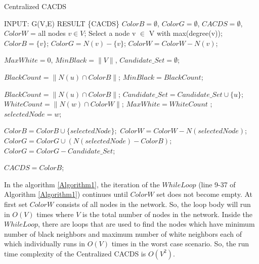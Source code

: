 \begin{algorithm}

\caption{Centralized CACDS}
\label{Algorithm1}

\begin{algorithmic}[1]
 \STATE INPUT: G(V,E)
 \STATE RESULT \{CACDS\}
\STATE $ColorB=\emptyset$, $ColorG=\emptyset$, $CACDS=\emptyset$,
\STATE $ColorW$ = all nodes $v\in V$;
\STATE Select a node v $\in$ V with max(degree(v));
\STATE $ ColorB = \{v\} $;
\STATE $ ColorG= N(v)-\{v\}$;
\STATE $ ColorW=ColorW-N(v)$;


 
   \STATE $MaxWhite=0$, $MinBlack=\|V\|$, $Candidate\_Set=\emptyset$;
 
        
            \STATE $BlackCount = \|N(u) \cap ColorB\|$;
                \STATE $MinBlack= BlackCount$;
            \ENDIF
        \ENDFOR
        
            \STATE $ BlackCount = \|N(u) \cap ColorB\|$;
           \STATE $ Candidate\_Set = Candidate\_Set \cup \{u\} $;
            \ENDIF
        \ENDFOR
                \STATE $ WhiteCount = \|N(w) \cap ColorW\|$;
                 \STATE  $MaxWhite= WhiteCount$ ;
                 \STATE $selectedNode=w$;
                \ENDIF
            \ENDFOR
            
               
                \STATE $ ColorB = ColorB \cup \{selectedNode\}; $ 
                \STATE $ColorW = ColorW-N(selectedNode)$; \\
                \STATE $ ColorG = ColorG \cup (N(selectedNode)-ColorB); $
            \ELSE
                \STATE $ColorG = ColorG - Candidate\_Set$;
            \ENDIF
            
\ENDWHILE
\STATE $ CACDS= ColorB$;

\end{algorithmic}
\end{algorithm}


In the algorithm \ref{Algorithm1}, the iteration of the $While Loop$ (line 9-37 of Algorithm \ref{Algorithm1}) continues until $ColorW$ set does not become empty. At first set $ColorW$ consists of all nodes in the network. So, the loop body will run in $O(V)$ times where $V$ is the total number of nodes in the network. Inside the $While Loop$, there are loops that are used to find the nodes which have minimum number of black neighbors and maximum number of white neighbors each of which individually runs in $O(V)$ times in the worst case scenario. So, the run time complexity of the Centralized CACDS is $O({V}^2)$.

